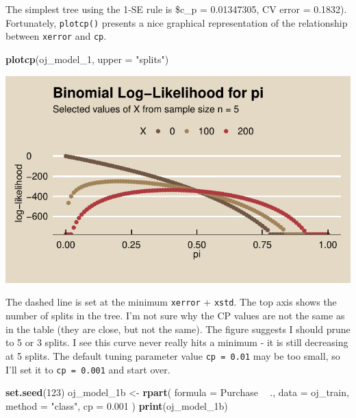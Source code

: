 \documentclass[]{book}
\newenvironment{Shaded}{\begin{snugshade}}{\end{snugshade}}
\newcommand{\DataTypeTok}[1]{\textcolor[rgb]{0.13,0.29,0.53}{#1}}
\newcommand{\DecValTok}[1]{\textcolor[rgb]{0.00,0.00,0.81}{#1}}
\newcommand{\FloatTok}[1]{\textcolor[rgb]{0.00,0.00,0.81}{#1}}
\newcommand{\KeywordTok}[1]{\textcolor[rgb]{0.13,0.29,0.53}{\textbf{#1}}}
\newcommand{\NormalTok}[1]{#1}
\newcommand{\OperatorTok}[1]{\textcolor[rgb]{0.81,0.36,0.00}{\textbf{#1}}}
\newcommand{\StringTok}[1]{\textcolor[rgb]{0.31,0.60,0.02}{#1}}
\begin{document}
The simplest tree using the 1-SE rule is \$c\_p = 0.01347305, CV error = 0.1832). Fortunately, \texttt{plotcp()} presents a nice graphical representation of the relationship between \texttt{xerror} and \texttt{cp}.

\begin{Shaded}
\begin{Highlighting}[]
\KeywordTok{plotcp}\NormalTok{(oj_model_}\DecValTok{1}\NormalTok{, }\DataTypeTok{upper =} \StringTok{"splits"}\NormalTok{)}
\end{Highlighting}
\end{Shaded}

\includegraphics{data-sci_files/figure-latex/unnamed-chunk-30-1.pdf}

The dashed line is set at the minimum \texttt{xerror} + \texttt{xstd}. The top axis shows the number of splits in the tree. I'm not sure why the CP values are not the same as in the table (they are close, but not the same). The figure suggests I should prune to 5 or 3 splits. I see this curve never really hits a minimum - it is still decreasing at 5 splits. The default tuning parameter value \texttt{cp\ =\ 0.01} may be too small, so I'll set it to \texttt{cp\ =\ 0.001} and start over.

\begin{Shaded}
\begin{Highlighting}[]
\KeywordTok{set.seed}\NormalTok{(}\DecValTok{123}\NormalTok{)}
\NormalTok{oj_model_1b <-}\StringTok{ }\KeywordTok{rpart}\NormalTok{(}
   \DataTypeTok{formula =}\NormalTok{ Purchase }\OperatorTok{~}\StringTok{ }\NormalTok{.,}
   \DataTypeTok{data =}\NormalTok{ oj_train,}
   \DataTypeTok{method =} \StringTok{"class"}\NormalTok{,}
   \DataTypeTok{cp =} \FloatTok{0.001}
\NormalTok{   )}
\KeywordTok{print}\NormalTok{(oj_model_1b)}
\end{Highlighting}
\end{Shaded}
\end{document}
